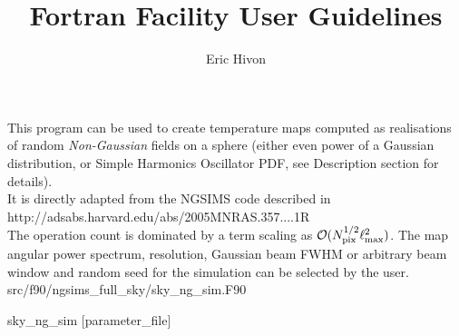 
\sloppy


\title{\healpix Fortran Facility User Guidelines}
 \section[sky\_ng\_sim]{\nosectionname}
\label{fac:sky_ng_sim}
\author{Eric Hivon}

\begin{facility}
{This program can be used to create temperature \healpix maps computed as realisations 
of random {\em Non-Gaussian} fields on a sphere (either even power of a Gaussian
distribution, or Simple Harmonics Oscillator PDF, see Description section for
details). \\
It is directly adapted from the NGSIMS code described in 
%
{http://adsabs.harvard.edu/abs/2005MNRAS.357....1R}%
\\
The operation count is dominated by a term scaling as
 ${\cal {O}}(N_{\mathrm{pix}}^{1/2} \ell_{\mathrm{max}}^2)$. 
The map angular power spectrum, resolution, Gaussian beam FWHM or arbitrary beam window  
and random seed for the simulation can be selected by the user.
}
{src/f90/ngsims\_full\_sky/sky\_ng\_sim.F90}
\end{facility}

\begin{f90facility}
{sky\_ng\_sim [parameter\_file]}
\end{f90facility}


